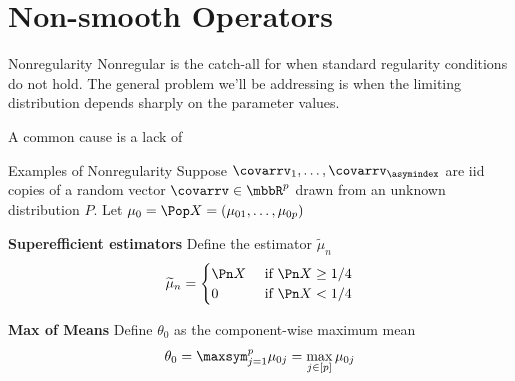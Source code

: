 \documentclass[aspectratio=169, professionalfonts]{beamer}
\begin{document}




\section{Non-smooth Operators}
\begin{frame}{Nonregularity}
	Nonregular is the catch-all for when standard regularity conditions do
	not hold.
	\vfill \pause
	The general problem we'll be addressing is when the limiting
	distribution depends sharply on the parameter values.

	\vfill
	A common cause is a lack of

	\vfill
\end{frame}

\begin{frame}{Examples of Nonregularity}
	Suppose $\covarrv_1, \ldots, \covarrv_{\asymindex}$ are iid copies of a random vector
	$\covarrv \in \mbbR^{p}$ drawn from an unknown distribution $P$. Let $\mu_0 = \Pop X
		= (\mu_{01}, \ldots, \mu_{0p})$

	\vfill \pause

	\textbf{Superefficient estimators}
	Define the estimator $\widetilde{\mu}_n$
	\begin{displaymath}
		\widetilde{\mu}_n = \begin{cases} \Pn X & \text { if } \Pn X \geq 1/4 \\
              0     & \text { if } \Pn X < 1/4\end{cases}
	\end{displaymath}

	\vfill \pause

	\textbf{Max of Means}
	Define $\theta_0$ as the component-wise maximum mean
	\begin{displaymath}
		\theta_0 = \maxsym_{j = 1}^p \mu_{0j} = \max_{j \in [p]} \mu_{0j}
	\end{displaymath}
\end{frame}
\end{document}
